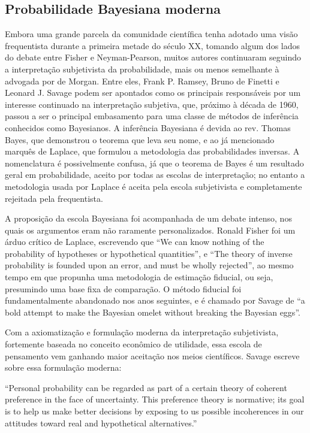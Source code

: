 \documentclass[12pt,a4paper]{article}
\begin{document}
\subsection{Probabilidade Bayesiana moderna}
Embora uma grande parcela da comunidade científica tenha adotado uma visão frequentista durante a primeira metade do século XX,
tomando algum dos lados do debate entre Fisher e Neyman-Pearson, muitos autores continuaram seguindo a interpretação 
subjetivista da probabilidade, mais ou menos semelhante à advogada por de Morgan. Entre eles, Frank P. Ramsey, 
Bruno de Finetti e Leonard J. Savage
podem ser apontados como os principais responsáveis por um interesse continuado na interpretação subjetiva, que, próximo à
década de 1960, passou a ser o principal embasamento para uma classe de métodos de inferência conhecidos como Bayesianos. 
A inferência Bayesiana é devida ao rev. Thomas Bayes, que demonstrou o teorema que leva seu nome, e ao já mencionado marquês de
Laplace, que formulou a metodologia das probabilidades inversas. A nomenclatura é possivelmente confusa, já que o teorema 
de Bayes é um resultado geral em probabilidade, aceito por todas as escolas de interpretação; no entanto a metodologia usada
por Laplace é aceita pela escola subjetivista e completamente rejeitada pela frequentista. 

A proposição da escola Bayesiana foi acompanhada de um debate intenso, nos quais os argumentos eram não raramente personalizados.
Ronald Fisher foi um árduo crítico
de Laplace, escrevendo que ``We can know nothing of the probability of hypotheses or hypothetical quantities''\cite{Fisher1921},
e ``The theory of inverse probability is founded upon an error, and must be wholly rejected''\cite{Fisher1925}, ao mesmo tempo
em que propunha uma metodologia de estimação fiducial, ou seja, presumindo uma base fixa de comparação. O método fiducial foi
fundamentalmente abandonado nos anos seguintes, e é chamado por Savage de ``a bold attempt to make the Bayesian omelet without
breaking the Bayesian eggs''\cite{Savage60}. 

Com a axiomatização e formulação moderna da interpretação subjetivista, fortemente baseada no conceito econômico de utilidade,
essa escola de pensamento vem ganhando maior aceitação nos meios científicos. Savage escreve sobre essa formulação moderna:

``Personal probability can be regarded as part of a certain theory of coherent preference in the face of uncertainty. This
preference theory is normative; its goal is to help us make better decisions by exposing to us possible incoherences in our
attitudes toward real and hypothetical alternatives.''\cite{Savage67}
\end{document}
